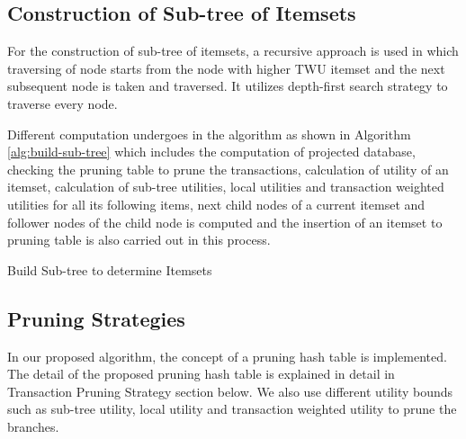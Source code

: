 \documentclass[11pt,openright]{report}
\begin{document}
\subsection{Construction of Sub-tree of Itemsets} \label{ss:sub-tree-itemsets}
For the construction of sub-tree of itemsets, a recursive approach is used in which traversing of node starts from the node with higher TWU itemset and the next subsequent node is taken and traversed. It utilizes depth-first search strategy to traverse every node.

Different computation undergoes in the algorithm as shown in Algorithm \ref{alg:build-sub-tree} which includes the computation of projected database, checking the pruning table to prune the transactions, calculation of utility of an itemset, calculation of sub-tree utilities, local utilities and transaction weighted utilities for all its following items, next child nodes of a current itemset and follower nodes of the child node is computed and the insertion of an itemset to pruning table is also carried out in this process.

 {\SetAlgoNoLine
 	\begin{algorithm}[h]
 		\caption{Build Sub-tree to determine Itemsets}
 		\label{alg:build-sub-tree}
 	\end{algorithm}
 }

\subsection{Pruning Strategies}
In our proposed algorithm, the concept of a pruning hash table is implemented. The detail of the proposed pruning hash table is explained in detail in Transaction Pruning Strategy section below. We also use different utility bounds such as sub-tree utility, local utility and transaction weighted utility to prune the branches.
\end{document}
